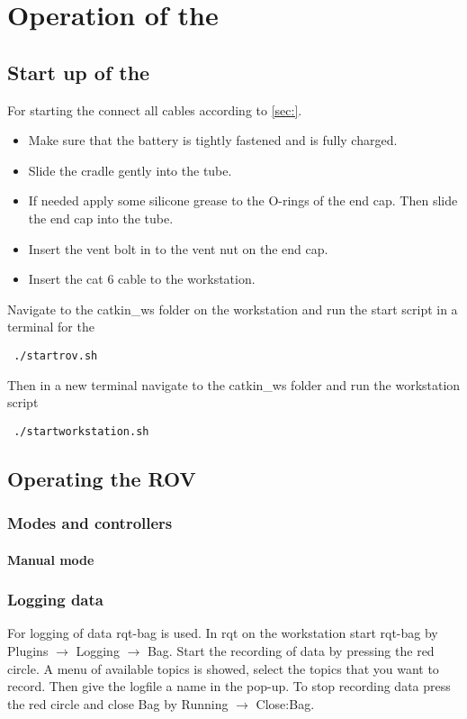 \chapter{Operation of the \abbrROV} \label{app:operation}

\section{Start up of the \abbrROV}
For starting the \abbrROV connect all cables according to \ref{sec:}.
\begin{itemize}
	\item Make sure that the battery is tightly fastened and is fully charged. 
	\item Slide the cradle gently into the \abbrROV tube. 
	\item If needed apply some silicone grease to the O-rings of the end cap. Then slide the end cap into the \abbrROV tube.
	\item Insert the vent bolt in to the vent nut on the end cap.
	\item Insert the cat 6 cable to the workstation.
 \end{itemize} 
Navigate to the catkin\_ws folder on the workstation and run the start script in a terminal for the \abbrROV
\begin{lstlisting}
 ./startrov.sh
\end{lstlisting}
Then in a new terminal navigate to the catkin\_ws folder and run the workstation script
\begin{lstlisting}
 ./startworkstation.sh
\end{lstlisting} 
\section{Operating the ROV}

\subsection{Modes and controllers}

\subsubsection{Manual mode}

\subsection{Logging data}
For logging of data rqt-bag is used. In rqt on the workstation start rqt-bag by Plugins $\rightarrow$ Logging $\rightarrow$ Bag. Start the recording of data by pressing the red circle. A menu of available topics is showed, select the topics that you want to record. Then give the logfile a name in the pop-up.
To stop recording data press the red circle and close Bag by Running $\rightarrow$ Close:Bag.


